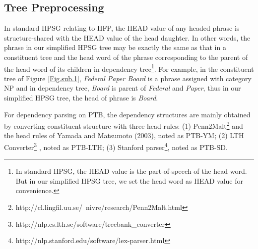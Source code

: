 \documentclass[11pt,a4paper]{article}
\begin{document}
\begin{figure*}[t!]
    \centering
    \caption{Constituent, dependency and two different simplified HPSG structures of the same sentence which is indexed from 1 to 9 and assigned interval range for each node. Dotted box represents the same part. The special category  is assigned to divide the phrase with multiple heads.
    Division span structure adds token  in front of the category to distinguish whether the phrase is on the left or right of the head. Thus the head is the last one of the category with  which is marked with a box. Joint span structure contains constitute phrase and dependency arc. \textit{Categ} in each node represents the category of each constituent and \textit{HEAD} indicates the head word.}
    \label{fig2}
\end{figure*}

\subsection{Tree Preprocessing}

In standard HPSG relating to HFP, the HEAD value of any headed phrase is structure-shared with the HEAD value of the head daughter. 
In other words, the phrase in our simplified HPSG tree may be exactly the same as that in a constituent tree and the head word of the phrase corresponding to the parent of the head word of its children in dependency tree\footnote{In standard HPSG, the HEAD value is the part-of-speech of the head word. But in our simplified HPSG tree, we set the head word as HEAD value for convenience.}.
For example, in the constituent tree of Figure \ref{Fig.sub.1}, \textit{Federal Paper Board} is a phrase  assigned with category NP and in dependency tree, \textit{Board} is parent of \textit{Federal} and \textit{Paper}, thus in our simplified HPSG tree, the head of phrase  is \textit{Board}. 

For dependency parsing on PTB, the dependency structures are mainly obtained by converting constituent structure with three head rules:
(1) Penn2Malt{\footnote{http://cl.lingfil.uu.se/~nivre/research/Penn2Malt.html}}
and the head rules of Yamada and Matsumoto (2003), noted as PTB-YM;
(2) LTH Converter{\footnote{http://nlp.cs.lth.se/software/treebank\_converter}} \cite{JohanssonW07-2416}, noted as PTB-LTH;
(3) Stanford parser{\footnote{http://nlp.stanford.edu/software/lex-parser.html}}\cite{Marieffe06generatingtyped},  noted as PTB-SD.
\end{document}
